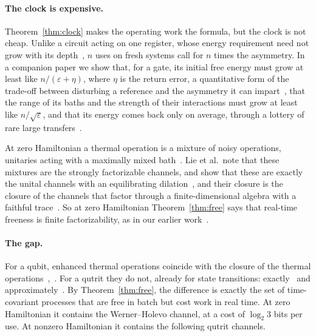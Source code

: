 \documentclass[11pt]{article}
\theoremstyle{definition}
\theoremstyle{remark}
\begin{document}
\paragraph{The clock is expensive.} Theorem~\ref{thm:clock} makes the operating work the formula, but the clock is not cheap. Unlike a circuit acting on one register, whose energy requirement need not grow with its depth~\cite{ChiribellaYangRenner21}, $n$ uses on fresh systems call for $n$ times the asymmetry. In a companion paper we show that, for a gate, its initial free energy must grow at least like $n/(\varepsilon+\eta)$, where $\eta$ is the return error, a quantitative form of the trade-off between disturbing a reference and the asymmetry it can impart~\cite{MarvianSpekkens19}, that the range of its baths and the strength of their interactions must grow at least like $n/\sqrt\varepsilon$, and that its energy comes back only on average, through a lottery of rare large transfers~\cite{KeepingTime}.

At zero Hamiltonian a thermal operation is a mixture of noisy operations, unitaries acting with a maximally mixed bath~\cite{HHO03}. Lie et al.\ note that these mixtures are the strongly factorizable channels, and show that these are exactly the unital channels with an equilibrating dilation~\cite[Eq.~(14)]{LieEtAl26}, and their closure is the closure of the channels that factor through a finite-dimensional algebra with a faithful trace~\cite{MullerHermesPerry,ClosedMemory}. So at zero Hamiltonian Theorem~\ref{thm:free} says that real-time freeness is finite factorizability, as in our earlier work~\cite{Memory}.

\paragraph{The gap.} For a qubit, enhanced thermal operations coincide with the closure of the thermal operations~\cite{Cwiklinski15},~\cite[Thm.~10]{vomEnde22}. For a qutrit they do not, already for state transitions: exactly~\cite{Cwiklinski15} and approximately~\cite{DingFengHu21}. By Theorem~\ref{thm:free}, the difference is exactly the set of time-covariant processes that are free in batch but cost work in real time. At zero Hamiltonian it contains the Werner--Holevo channel, at a cost of $\log_2 3$ bits per use. At nonzero Hamiltonian it contains the following qutrit channels.
\end{document}
